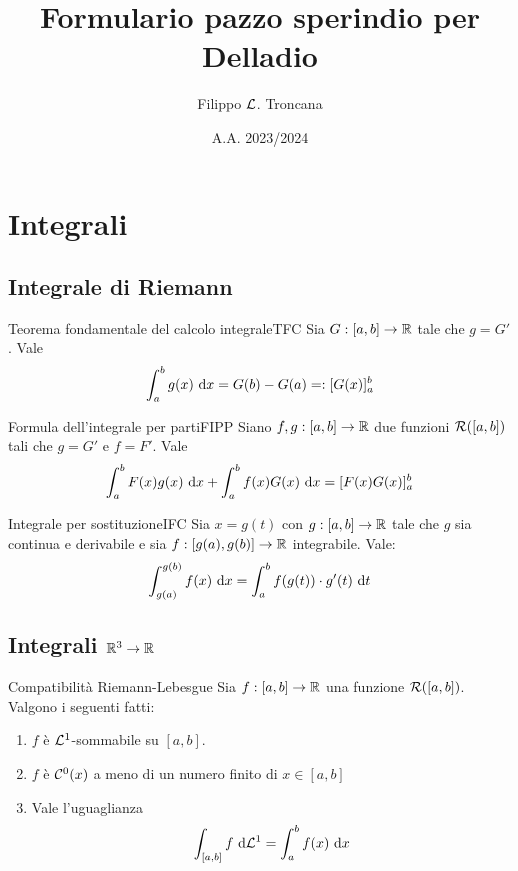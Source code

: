 \documentclass{article}
\title{Formulario pazzo sperindio per Delladio}
\author{Filippo $\mathcal{L}$. Troncana}
\date{A.A. 2023/2024}
\begin{document}
\maketitle

\section{Integrali}

\subsection{Integrale di Riemann}

\begin{proposition}{Teorema fondamentale del calcolo integrale}{TFC}
    Sia $G:[a,b]\to \mathbb{R}$ tale che $g = G'$. Vale
    \[\int_a^b g(x) \text{ d} x = G(b)-G(a) =: [G(x)]_a^b\]    
\end{proposition}

\begin{proposition}{Formula dell'integrale per parti}{FIPP}
    Siano $f,g : [a,b]\to\mathbb{R}$ due funzioni $\mathcal{R}([a,b])$ tali che $g = G'$ e $f = F'$. Vale
    \[\int_a^b F(x)g(x) \text{ d} x +  \int_a^b  f(x) G(x) \text{ d} x = [F(x)G(x)]_a^b \]
\end{proposition}

\begin{proposition}{Integrale per sostituzione}{IFC}
    Sia $x = g(t)$ con $g : [a,b]\to\mathbb{R}$ tale che $g$ sia continua e derivabile e sia $f : [g(a),g(b)]\to \mathbb{R}$ integrabile. Vale:
    \[\int_{g(a)}^{g(b)} f(x) \text{ d} x = \int_a^b f(g(t)) \cdot g'(t) \text{ d} t \]
\end{proposition}

\subsection{Integrali $\mathbb{R}^3 \to \mathbb{R}$}

\begin{proposition}{Compatibilità Riemann-Lebesgue}{}
    Sia $f: [a,b]\to\mathbb{R}$ una funzione $\mathcal{R}([a,b])$. Valgono i seguenti fatti:\begin{enumerate}
        \item $f$ è $\mathcal{L}^1$-sommabile su $[a,b]$.
        \item $f$ è $\mathcal{C}^0(x)$ a meno di un numero finito di $x \in [a,b]$
        \item Vale l'uguaglianza \[\int_{[a,b]} f \text{ d}\mathcal{L}^1 = \int_a^b f(x)\text{ d} x\]
    \end{enumerate}
\end{proposition}
\end{document}
